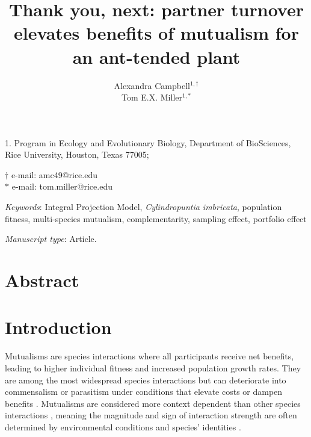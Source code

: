\documentclass[11pt]{article}
\title{Thank you, next: partner turnover elevates benefits of mutualism for an ant-tended plant}
\author{Alexandra Campbell$^{1,\dagger}$ \\ 
	Tom E.X. Miller$^{1,\ast}$}
\date{}
\begin{document}
	
	\maketitle
	
	\noindent{} 1. Program in Ecology and Evolutionary Biology, Department of BioSciences, Rice University, Houston, Texas 77005;
	
	\noindent{} $\dagger$ e-mail: amc49@rice.edu\\
	\noindent{} $\ast$ e-mail: tom.miller@rice.edu
	
	\bigskip
	
	\textit{Keywords}:  Integral Projection Model, \textit{Cylindropuntia imbricata}, population fitness, multi-species mutualism, complementarity, sampling effect, portfolio effect
	
	\bigskip
	
	\textit{Manuscript type}: Article.
	
	\bigskip
	
	
\linenumbers{}
\modulolinenumbers[3]

\newpage{}

\section*{Abstract}


\newpage{}
\section*{Introduction}
Mutualisms are species interactions where all participants receive net benefits, leading to higher individual fitness and increased population growth rates. 
They are among the most widespread species interactions \citep{Bronstein1994,Chamberlain2014,Frederickson2013,Axelrod1981,Leigh2010} but can deteriorate into commensalism or parasitism under conditions that elevate costs or dampen benefits \citep{Rodriguez-Rodriguez2017,Song2020,Mandyam2014,Thrall2007, Bahia2022}.
Mutualisms are considered more context dependent than other species interactions \citep{Chamberlain2014,Frederickson2013}, meaning the magnitude and sign of interaction strength are often determined by environmental conditions and species' identities \cite{Noe1994,Leigh2010}.
\end{document}
